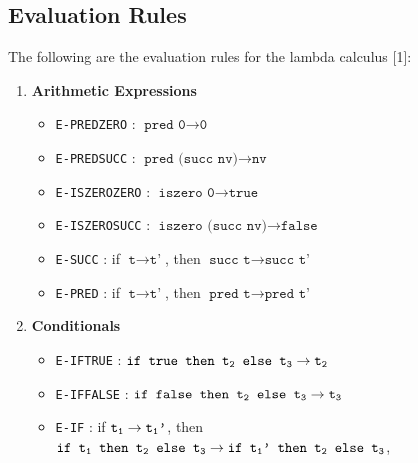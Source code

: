 \documentclass[fleqn, 11pt]{article}
\begin{document}
\subsection{Evaluation Rules}

The following are the evaluation rules for the lambda calculus [1]:

\begin{enumerate}
    \item \textbf{Arithmetic Expressions}
    \begin{itemize}
        \item \texttt{E-PREDZERO} : $\texttt{pred 0} \rightarrow \texttt{0}$ 
        \item \texttt{E-PREDSUCC} : $\texttt{pred (succ nv)} \rightarrow \texttt{nv}$ 
        \item \texttt{E-ISZEROZERO} : $\texttt{iszero 0} \rightarrow \texttt{true}$ 
        \item \texttt{E-ISZEROSUCC} : $\texttt{iszero (succ nv)} \rightarrow \texttt{false}$ 
        \item \texttt{E-SUCC} : if $\texttt{t} \rightarrow \texttt{t'}$, then $\texttt{succ t} \rightarrow \texttt{succ t'}$
        \item \texttt{E-PRED} : if $\texttt{t} \rightarrow \texttt{t'}$, then $\texttt{pred t} \rightarrow \texttt{pred t'}$
    \end{itemize}

    \item \textbf{Conditionals}
    \begin{itemize}
        \item \texttt{E-IFTRUE} : $\texttt{if true then t\textsubscript{2} else t\textsubscript{3}} \rightarrow \texttt{t\textsubscript{2}}$
        \item \texttt{E-IFFALSE} : $\texttt{if false then t\textsubscript{2} else t\textsubscript{3}} \rightarrow \texttt{t\textsubscript{3}}$
        \item \texttt{E-IF} : if $\texttt{t\textsubscript{1}} \rightarrow \texttt{t\textsubscript{1}'}$, 
        then $\texttt{if t\textsubscript{1} then t\textsubscript{2} else t\textsubscript{3}} \rightarrow 
        \texttt{if t\textsubscript{1}' then t\textsubscript{2} else t\textsubscript{3}}$,
    \end{itemize}


\end{enumerate}
\end{document}
